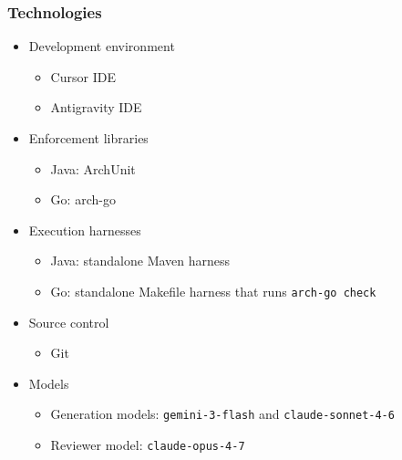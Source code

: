 \documentclass[sigconf,screen]{acmart}
\begin{document}
\subsubsection{Technologies}
\begin{itemize}
    \item Development environment
    \begin{itemize}
        \item Cursor IDE
        \item Antigravity IDE
    \end{itemize}
    \item Enforcement libraries
    \begin{itemize}
        \item Java: ArchUnit
        \item Go: arch-go
    \end{itemize}
    \item Execution harnesses
    \begin{itemize}
        \item Java: standalone Maven harness
        \item Go: standalone Makefile harness that runs \texttt{arch-go check}
    \end{itemize}
    \item Source control
    \begin{itemize}
        \item Git
    \end{itemize}
    \item Models
    \begin{itemize}
        \item Generation models: \texttt{gemini-3-flash} and \texttt{claude-sonnet-4-6}
        \item Reviewer model: \texttt{claude-opus-4-7}
    \end{itemize}
\end{itemize}
\end{document}
